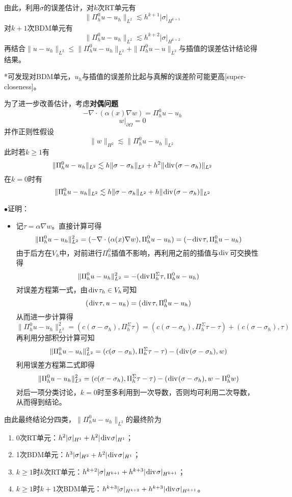 \documentclass[a4paper,UTF8,fontset=windows]{ctexart}
\renewcommand*{\div}{\hspace{0.07em}\mathrm{div}\hspace{0.07em}}
\newcommand{\proo}[1]{{\kaishu $\bullet$证明：
\begin{itemize}
    \item[] #1
\end{itemize}
}}
\begin{document}
\begin{enumerate}
{        由此，利用$\sigma$的误差估计，对$k$次RT单元有
        $$\|\Pi_h^0u-u_h\|_{L^2}\lesssim h^{k+1}|\sigma|_{H^{k+1}}$$
        对$k+1$次BDM单元有
        $$\|\Pi_h^0u-u_h\|_{L^2}\lesssim h^{k+2}|\sigma|_{H^{k+2}}$$
        再结合$\|u-u_h\|_{L^2}\le\|\Pi_h^0u-u_h\|_{L^2}+\|\Pi_h^0u-u\|_{L^2}$与插值的误差估计结论得结果。
    }

    *可发现对BDM单元，$u_h$与插值的误差阶比起与真解的误差阶可能更高[super-closeness]。
\end{enumerate}

为了进一步改善估计，考虑\textbf{对偶问题}
$$-\nabla\cdot(\alpha(x)\nabla w)=\Pi_h^0u-u_h$$
$$w\big|_{\partial\Omega}=0$$
并作正则性假设
$$\|w\|_{H^2}\lesssim\|\Pi_h^0u-u_h\|_{L^2}$$
此时若$k\ge1$有
$$\|\Pi_h^0u-u_h\|_{L^2}\lesssim h\|\sigma-\sigma_h\|_{L^2}+h^2\|\div(\sigma-\sigma_h)\|_{L^2}$$
在$k=0$时有
$$\|\Pi_h^0u-u_h\|_{L^2}\lesssim h\|\sigma-\sigma_h\|_{L^2}+h\|\div(\sigma-\sigma_h)\|_{L^2}$$

\proo{
    记$\tau=\alpha\nabla w$。直接计算可得
    $$\|\Pi_h^0u-u_h\|_{L^2}^2=(-\nabla\cdot(\alpha(x)\nabla w),\Pi_h^0u-u_h)=(-\div\tau,\Pi_h^0u-u_h)$$
    由于后方在$V_h$中，对前进行$\Pi_h^0$插值不影响，再利用之前的插值与$\div$可交换性得
    $$\|\Pi_h^0u-u_h\|_{L^2}^2=-(\div\Pi_h^\Sigma\tau,\Pi_h^0u-u_h)$$
    对误差方程第一式，由$\div\tau_h\in V_h$可知
    $$(\div\tau,u-u_h)=(\div\tau,\Pi_h^0u-u_h)$$
    从而进一步计算得
    $$\|\Pi_h^0u-u_h\|_{L^2}^2=(c(\sigma-\sigma_h),\Pi_h^\Sigma\tau)=(c(\sigma-\sigma_h),\Pi_h^\Sigma\tau-\tau)+(c(\sigma-\sigma_h),\tau)$$
    再利用分部积分计算可知
    $$\|\Pi_h^0u-u_h\|_{L^2}^2=(c(\sigma-\sigma_h),\Pi_h^\Sigma\tau-\tau)-(\div(\sigma-\sigma_h),w)$$
    利用误差方程第二式即得
    $$\|\Pi_h^0u-u_h\|_{L^2}^2=(c(\sigma-\sigma_h),\Pi_h^\Sigma\tau-\tau)-(\div(\sigma-\sigma_h),w-\Pi_h^0w)$$
    对后一项分类讨论，$k=0$时至多利用到一次导数，否则均可利用二次导数，从而得到结论。
}

由此最终结论分四类，$\|\Pi_h^0u-u_h\|_{L^2}$的最终阶为
\begin{enumerate}
    \item 0次RT单元：$h^2|\sigma|_{H^1}+h^2|\div\sigma|_{H^1}$；
    \item 1次BDM单元：$h^3|\sigma|_{H^2}+h^2|\div\sigma|_{H^1}$；
    \item $k\ge1$时$k$次RT单元：$h^{k+2}|\sigma|_{H^{k+1}}+h^{k+3}|\div\sigma|_{H^{k+1}}$；
    \item $k\ge1$时$k+1$次BDM单元：$h^{k+3}|\sigma|_{H^{k+2}}+h^{k+3}|\div\sigma|_{H^{k+1}}$。
\end{enumerate}
\end{document}
